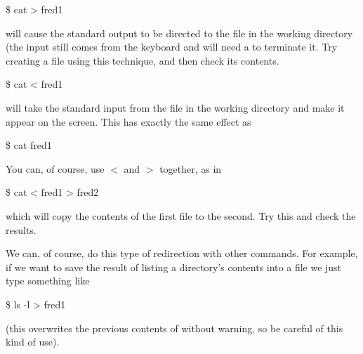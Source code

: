 \begin{ttoutenv}
\$  cat > fred1
\end{ttoutenv}
will cause the standard output to be directed to the file 
in the working directory (the input still comes from the keyboard and
will need a  to terminate it. Try creating a file
 using this technique, and then check its contents.

\begin{ttoutenv}
\$  cat < fred1 
\end{ttoutenv}
will take the standard input from the file 
in the working directory and make it appear on the screen. This has
exactly the same effect as 
\begin{ttoutenv}
\$  cat fred1 
\end{ttoutenv}

You can, of course, use $<$ and $>$ together, as in
\begin{ttoutenv}
\$  cat < fred1 > fred2
\end{ttoutenv}
which will copy the contents of the first file to the second. Try this and
check the results.

We can, of course, do this type of redirection with other
commands. For example, if we want to save the result of listing a
directory's contents into a file we just type something like
\begin{ttoutenv}
\$  ls -l > fred1
\end{ttoutenv}
(this overwrites the previous contents of  without
warning, so be careful of this kind of use).





